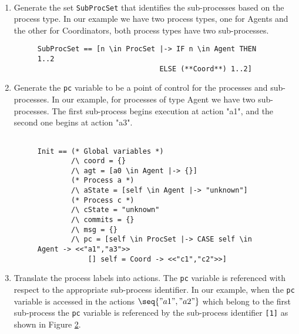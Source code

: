 \hfill\\
\begin{enumerate}

\item Generate the set \verb|SubProcSet| that identifies the sub-processes based on the process type.
In our example we have two process types, one for Agents and the other for Coordinators, both process types have two sub-processes.

\FloatBarrier
\begin{figure}
\label{2pcSubTla}
\begin{lstlisting}[frame = tlrb, numbers=none]
SubProcSet == [n \in ProcSet |-> IF n \in Agent THEN 1..2
                             ELSE (**Coord**) 1..2]

\end{lstlisting}
\end{figure}
\FloatBarrier

\item Generate the \verb|pc| variable to be a point of control for the processes and sub-processes.
In our example, for processes of type Agent we have two sub-processes. The first sub-process begins execution at action "a1", and the second one begins at action "a3".
\hfill\\

\FloatBarrier
\begin{figure}[!h]
\begin{lstlisting}[frame = tlrb, numbers=none]

Init == (* Global variables *)
        /\ coord = {}
        /\ agt = [a0 \in Agent |-> {}]
        (* Process a *)
        /\ aState = [self \in Agent |-> "unknown"]
        (* Process c *)
        /\ cState = "unknown"
        /\ commits = {}
        /\ msg = {}
        /\ pc = [self \in ProcSet |-> CASE self \in Agent -> <<"a1","a3">>
            [] self = Coord -> <<"c1","c2">>]
\end{lstlisting}
\end{figure}
\FloatBarrier

\item Translate the process labels into \tlaplus actions. The \verb|pc| variable is referenced with respect to the appropriate sub-process identifier.
In our example, when the \verb|pc| variable is accessed in the actions $\seq{"a1", "a2"}$ which belong to the first sub-process the \verb|pc| variable is referenced by the sub-process identifier \verb|[1]| as shown in Figure \ref{2pcSubProcPc}.

\FloatBarrier
\begin{figure}[!h]
\label{2pcSubProcPc}
\begin{lstlisting}[frame = tlrb, numbers=none]


\end{lstlisting}
\end{figure}
\end{enumerate}
